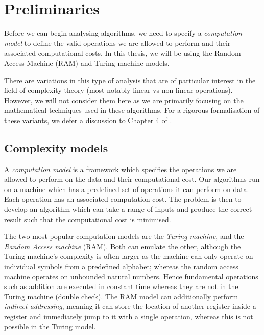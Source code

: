 \chapter{Preliminaries}\label{chp:preliminaries}

Before we can begin analysing algorithms, we need to specify a \emph{computation model} to define the valid operations we are allowed to perform and their associated computational costs. In this thesis, we will be using the Random Access Machine (RAM) and Turing machine models.

There are variations in this type of analysis that are of particular interest in the field of complexity theory (most notably linear vs non-linear operations). However, we will not consider them here as we are primarily focusing on the mathematical techniques used in these algorithms. For a rigorous formalisation of these variants, we defer a discussion to Chapter 4 of \cite{burgisser}.

\section{Complexity models}%
\label{sec:Complexity models}

A \textit{computation model} is a framework which specifies the operations we are allowed to perform on the data and their computational cost. Our algorithms run on a machine which has a predefined set of operations it can perform on data. Each operation has an associated computation cost. The problem is then to develop an algorithm which can take a range of inputs and produce the correct result such that the computational cost is minimised.

The two most popular computation models are the \textit{Turing machine}, and the \textit{Random Access machine} (RAM). Both can emulate the other, although the Turing machine's complexity is often larger as the machine can only operate on individual symbols from a predefined alphabet; whereas the random access machine operates on unbounded natural numbers. Hence fundamental operations such as addition are executed in constant time whereas they are not in the Turing machine (double check). The RAM model can additionally perform \emph{indirect addressing}, meaning it can store the location of another register inside a register and immediately jump to it with a single operation, whereas this is not possible in the Turing model.

